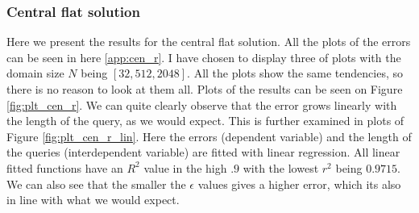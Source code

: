 \documentclass[11pt]{article}
\theoremstyle{definition}
\begin{document}
\subsubsection{Central flat solution}
Here we present the results for the central flat solution. All the plots of the errors can be seen in here \ref{app:cen_r}. I have chosen to display three of plots with the domain size $N$ being $[32,512,2048]$. All the plots show the same tendencies, so there is no reason to look at them all. Plots of the results can be seen on Figure \ref{fig:plt_cen_r}. We can quite clearly observe that the error grows linearly with the length of the query, as we would expect. This is further examined in plots of Figure \ref{fig:plt_cen_r_lin}. Here the errors (dependent variable) and the length of the queries (interdependent variable) are fitted with linear regression. All linear fitted functions have an $R^2$ value in the high $.9$ with the lowest $r^2$ being $0.9715$.  We can also see that the smaller the $\epsilon$ values gives a higher error, which its also in line with what we would expect.
\end{document}
